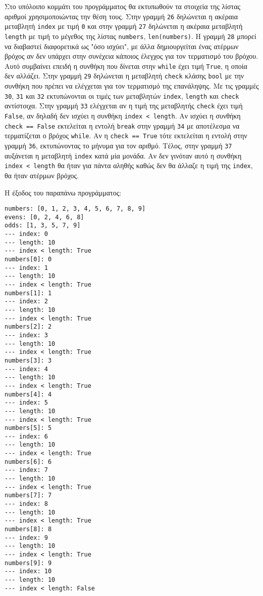 \documentclass[14pt]{extreport}
\begin{document}
Στο υπόλοιπο κομμάτι του προγράμματος θα εκτυπωθούν τα στοιχεία της λίστας αριθμοί χρησιμοποιώντας την θέση τους. Στην γραμμή \lstinline{26} δηλώνεται η ακέραια μεταβλητή \lstinline{index} με τιμή \lstinline{0} και στην γραμμή \lstinline{27} δηλώνεται η ακέραια μεταβλητή \lstinline{length} με τιμή το μέγεθος της λίστας \lstinline{numbers}, \lstinline{len(numbers)}. Η γραμμή \lstinline{28} μπορεί να διαβαστεί διαφορετικά ως "όσο ισχύει", με άλλα δημιουργείται ένας ατέρμων βρόχος αν δεν υπάρχει στην συνέχεια κάποιος έλεγχος για τον τερματισμό του βρόχου. Αυτό συμβαίνει επειδή η συνθήκη που δίνεται στην \lstinline{while} έχει τιμή \lstinline{True}, η οποία δεν αλλάζει. Στην γραμμή \lstinline{29} δηλώνεται η μεταβλητή \lstinline{check} κλάσης \lstinline{bool} με την συνθήκη που πρέπει να ελέγχεται για τον τερματισμό της επανάληψης. Με τις γραμμές \lstinline{30}, \lstinline{31} και \lstinline{32} εκτυπώνονται οι τιμές των μεταβλητών \lstinline{index}, \lstinline{length} και \lstinline{check} αντίστοιχα. Στην γραμμή \lstinline{33} ελέγχεται αν η τιμή της μεταβλητής \lstinline{check} έχει τιμή \lstinline{False}, αν δηλαδή δεν ισχύει η συνθήκη \lstinline{index < length}. Αν ισχύει η συνθήκη \lstinline{check == False} εκτελείται η εντολή \lstinline{break} στην γραμμή \lstinline{34} με αποτέλεσμα να τερματίζεται ο βρόχος \lstinline{while}. Αν η \lstinline{check == True} τότε εκτελείται η εντολή στην γραμμή \lstinline{36}, εκτυπώνοντας το μήνυμα για τον αριθμό. Τέλος, στην γραμμή \lstinline{37} αυξάνεται η μεταβλητή \lstinline{index} κατά μία μονάδα. Aν δεν γινόταν αυτό η συνθήκη \lstinline{index < length} θα ήταν για πάντα αληθής καθώς δεν θα άλλαζε η τιμή της \lstinline{index}, θα ήταν ατέρμων βρόχος.

Η έξοδος του παραπάνω προγράμματος:

\begin{lstlisting}[language={}]
numbers: [0, 1, 2, 3, 4, 5, 6, 7, 8, 9]
evens: [0, 2, 4, 6, 8]
odds: [1, 3, 5, 7, 9]
--- index: 0
--- length: 10
--- index < length: True
numbers[0]: 0
--- index: 1
--- length: 10
--- index < length: True
numbers[1]: 1
--- index: 2
--- length: 10
--- index < length: True
numbers[2]: 2
--- index: 3
--- length: 10
--- index < length: True
numbers[3]: 3
--- index: 4
--- length: 10
--- index < length: True
numbers[4]: 4
--- index: 5
--- length: 10
--- index < length: True
numbers[5]: 5
--- index: 6
--- length: 10
--- index < length: True
numbers[6]: 6
--- index: 7
--- length: 10
--- index < length: True
numbers[7]: 7
--- index: 8
--- length: 10
--- index < length: True
numbers[8]: 8
--- index: 9
--- length: 10
--- index < length: True
numbers[9]: 9
--- index: 10
--- length: 10
--- index < length: False
\end{lstlisting}
\end{document}
